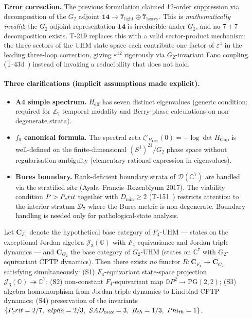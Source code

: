 \textbf{Error correction.} The previous formulation claimed
12-order suppression via decomposition of the $G_2$ adjoint
$\mathbf{14} \to \mathbf{7}_{\mathrm{light}} \oplus
\mathbf{7}_{\mathrm{heavy}}$. This is \emph{mathematically invalid}:
the $G_2$ adjoint representation $\mathbf{14}$ is irreducible under
$G_2$, and no $7+7$ decomposition exists. T-219 replaces this with a
valid sector-product mechanism: the three sectors of the UHM state
space each contribute one factor of $\varepsilon^4$ in the leading
three-loop correction, giving $\varepsilon^{12}$ rigorously via
$G_2$-invariant Fano coupling (T-43d~) instead of invoking a
reducibility that does not hold.

\paragraph{Three clarifications (implicit assumptions made explicit).}
\begin{itemize}[leftmargin=2em,nosep]
  \item \textbf{A4 simple spectrum.} $H_{\mathrm{eff}}$ has seven
        distinct eigenvalues (generic condition; required for
        $\mathbb Z_7$ temporal modality and Berry-phase calculations on
        non-degenerate strata).
  \item \textbf{$f_0$ canonical formula.} The spectral zeta
        $\zeta'_{H_{\mathrm{Gap}}}(0) = -\log \det H_{\mathrm{Gap}}$
        is well-defined on the finite-dimensional $(S^1)^{21}/G_2$
        phase space without regularisation ambiguity (elementary
        rational expression in eigenvalues).
  \item \textbf{Bures boundary.} Rank-deficient boundary strata of
        $\mathcal D(\mathbb C^7)$ are handled via the stratified site
        (Ayala--Francis--Rozenblyum 2017). The viability condition
        $P > P_crit$ together with $D_{\min} \geq 2$ (T-151~)
        restricts attention to the interior stratum $\mathcal D_7$
        where the Bures metric is non-degenerate. Boundary handling is
        needed only for pathological-state analysis.
\end{itemize}

\begin{theorembox}
\label{thm:t220-no-reduction}
Let $\mathbf{C}_{F_4}$ denote the hypothetical base category of
$F_4$-UHM --- states on the exceptional Jordan algebra
$\mathcal J_3(\mathbb O)$ with $F_4$-equivariance and Jordan-triple
dynamics --- and $\mathbf{C}_{G_2}$ the base category of $G_2$-UHM
(states on $\mathbb C^7$ with $G_2$-equivariant CPTP dynamics). Then
there exists \emph{no} functor $R\colon \mathbf{C}_{F_4} \to
\mathbf{C}_{G_2}$ satisfying simultaneously: (S1) $F_4$-equivariant
state-space projection $\mathcal J_3(\mathbb O) \twoheadrightarrow
\mathbb C^7$; (S2) non-constant $F_4$-equivariant map $\mathbb O P^2
\to \mathrm{PG}(2,2)$; (S3) algebra-homomorphism from Jordan-triple
dynamics to Lindblad CPTP dynamics; (S4) preservation of the
invariants $\{P_crit = 2/7,\ alpha = 2/3,\ SAD_{\max} = 3,\
R_{th} = 1/3,\ Phi_{th} = 1\}$.
\end{theorembox}


